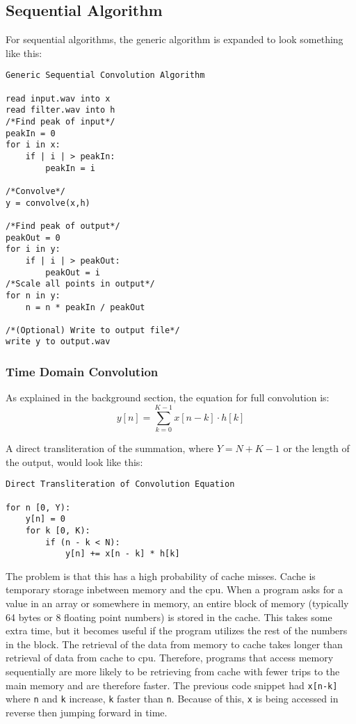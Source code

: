 
\subsection{Sequential Algorithm}
For sequential algorithms, the generic algorithm is expanded to look something like this:

\begin{verbatim}
Generic Sequential Convolution Algorithm

read input.wav into x
read filter.wav into h
/*Find peak of input*/
peakIn = 0
for i in x:
    if | i | > peakIn:
        peakIn = i
        
/*Convolve*/
y = convolve(x,h)

/*Find peak of output*/
peakOut = 0
for i in y:
    if | i | > peakOut:
        peakOut = i
/*Scale all points in output*/
for n in y:
    n = n * peakIn / peakOut

/*(Optional) Write to output file*/
write y to output.wav
\end{verbatim}
\subsubsection{Time Domain Convolution}
\indent \par As explained in the background section, the equation for full convolution is:
$$y[n] = \sum_{k=0}^{K-1} x[n-k] \cdot h[k]$$

A direct transliteration of the summation, where $Y = N + K -1$ or the length of the output, would look like this:

\begin{verbatim}
Direct Transliteration of Convolution Equation

for n [0, Y):
    y[n] = 0
    for k [0, K):
        if (n - k < N):
            y[n] += x[n - k] * h[k]
\end{verbatim}
The problem is that this has a high probability of cache misses. Cache is temporary storage inbetween memory and the \gls{cpu}. When a program asks for a value in an array or somewhere in memory, an entire block of memory (typically 64 bytes or 8 floating point numbers) is stored in the cache. This takes some extra time, but it becomes useful if the program utilizes the rest of the numbers in the block. The retrieval of the data from memory to cache takes longer than retrieval of data from cache to \gls{cpu}. Therefore, programs that access memory sequentially are more likely to be retrieving from cache with fewer trips to the main memory and are therefore faster. The previous code snippet had \verb|x[n-k]| where \verb|n| and \verb|k| increase, \verb|k| faster than \verb|n|. Because of this, \verb|x| is being accessed in reverse then jumping forward in time.


